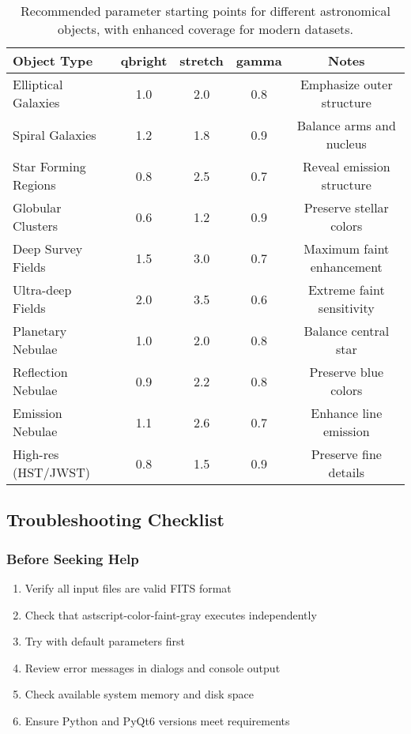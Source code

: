 \documentclass[11pt,a4paper]{article}
\begin{document}
\begin{table}[H]
\centering
\small
\begin{tabular}{@{}lcccc@{}}
\toprule
Object Type & qbright & stretch & gamma & Notes \\
\midrule
Elliptical Galaxies & 1.0 & 2.0 & 0.8 & Emphasize outer structure \\
Spiral Galaxies & 1.2 & 1.8 & 0.9 & Balance arms and nucleus \\
Star Forming Regions & 0.8 & 2.5 & 0.7 & Reveal emission structure \\
Globular Clusters & 0.6 & 1.2 & 0.9 & Preserve stellar colors \\
Deep Survey Fields & 1.5 & 3.0 & 0.7 & Maximum faint enhancement \\
Ultra-deep Fields & 2.0 & 3.5 & 0.6 & Extreme faint sensitivity \\
Planetary Nebulae & 1.0 & 2.0 & 0.8 & Balance central star \\
Reflection Nebulae & 0.9 & 2.2 & 0.8 & Preserve blue colors \\
Emission Nebulae & 1.1 & 2.6 & 0.7 & Enhance line emission \\
High-res (HST/JWST) & 0.8 & 1.5 & 0.9 & Preserve fine details \\
\bottomrule
\end{tabular}
\caption{Recommended parameter starting points for different astronomical
objects, with enhanced coverage for modern datasets.}
\label{tab:object-params}
\end{table}

\subsection{Troubleshooting Checklist}

\subsubsection{Before Seeking Help}

\begin{enumerate}
\item Verify all input files are valid FITS format
\item Check that astscript-color-faint-gray executes independently
\item Try with default parameters first
\item Review error messages in dialogs and console output
\item Check available system memory and disk space
\item Ensure Python and PyQt6 versions meet requirements
\end{enumerate}
\end{document}
